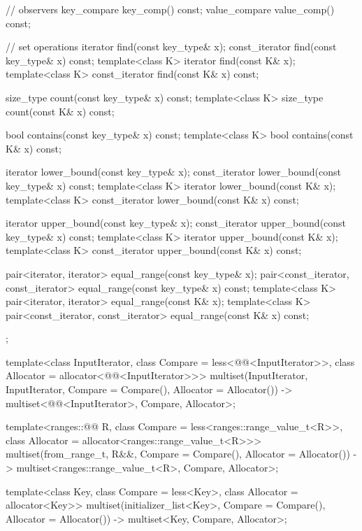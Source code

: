 \begin{codeblock}
{{    // observers
    key_compare key_comp() const;
    value_compare value_comp() const;

    // set operations
    iterator       find(const key_type& x);
    const_iterator find(const key_type& x) const;
    template<class K> iterator       find(const K& x);
    template<class K> const_iterator find(const K& x) const;

    size_type      count(const key_type& x) const;
    template<class K> size_type count(const K& x) const;

    bool           contains(const key_type& x) const;
    template<class K> bool contains(const K& x) const;

    iterator       lower_bound(const key_type& x);
    const_iterator lower_bound(const key_type& x) const;
    template<class K> iterator       lower_bound(const K& x);
    template<class K> const_iterator lower_bound(const K& x) const;

    iterator       upper_bound(const key_type& x);
    const_iterator upper_bound(const key_type& x) const;
    template<class K> iterator       upper_bound(const K& x);
    template<class K> const_iterator upper_bound(const K& x) const;

    pair<iterator, iterator>               equal_range(const key_type& x);
    pair<const_iterator, const_iterator>   equal_range(const key_type& x) const;
    template<class K>
      pair<iterator, iterator>             equal_range(const K& x);
    template<class K>
      pair<const_iterator, const_iterator> equal_range(const K& x) const;
  };

  template<class InputIterator,
           class Compare = less<@@<InputIterator>>,
           class Allocator = allocator<@@<InputIterator>>>
    multiset(InputIterator, InputIterator,
             Compare = Compare(), Allocator = Allocator())
      -> multiset<@@<InputIterator>, Compare, Allocator>;

  template<ranges::@@ R, class Compare = less<ranges::range_value_t<R>>,
           class Allocator = allocator<ranges::range_value_t<R>>>
    multiset(from_range_t, R&&, Compare = Compare(), Allocator = Allocator())
      -> multiset<ranges::range_value_t<R>, Compare, Allocator>;

  template<class Key, class Compare = less<Key>, class Allocator = allocator<Key>>
    multiset(initializer_list<Key>, Compare = Compare(), Allocator = Allocator())
      -> multiset<Key, Compare, Allocator>;

}
\end{codeblock}
